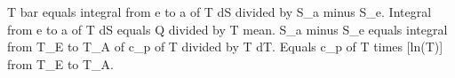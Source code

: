 T bar equals integral from e to a of T dS divided by S_a minus S_e.  
Integral from e to a of T dS equals Q divided by T mean.  
S_a minus S_e equals integral from T_E to T_A of c_p of T divided by T dT.  
Equals c_p of T times [ln(T)] from T_E to T_A.
